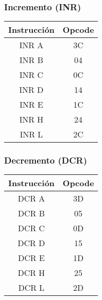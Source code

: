 \documentclass[12pt]{article}
\begin{document}
			\subsubsection{Incremento (INR)}
			
				\begin{table}[H]
					\centering
					\begin{tabular}{c|c}
						Instrucción & Opcode \\
						\midrule
						INR A & 3C \\
						INR B & 04 \\
						INR C & 0C \\
						INR D & 14 \\
						INR E & 1C \\
						INR H & 24 \\
						INR L & 2C \\
					\end{tabular}
				\end{table}
				
			\subsubsection{Decremento (DCR)}
			
				\begin{table}[H]
					\centering
					\begin{tabular}{c|c}
						Instrucción & Opcode \\
						\midrule
						DCR A & 3D \\
						DCR B & 05 \\
						DCR C & 0D \\
						DCR D & 15 \\
						DCR E & 1D \\
						DCR H & 25 \\
						DCR L & 2D \\
					\end{tabular}
				\end{table}
	
\end{document}
